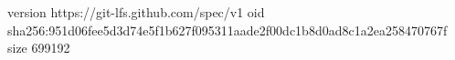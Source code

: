 version https://git-lfs.github.com/spec/v1
oid sha256:951d06fee5d3d74e5f1b627f095311aade2f00dc1b8d0ad8c1a2ea258470767f
size 699192
